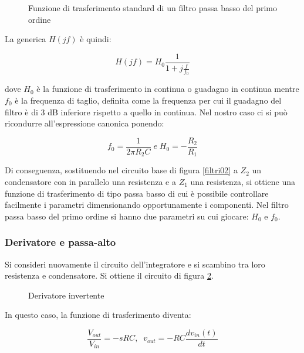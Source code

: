 \documentclass[../main.tex]{subfiles}
\begin{document}
\begin{figure}
\begin{center}


\label{filtri06}
\caption{Funzione di trasferimento standard di un filtro passa basso del primo ordine}	
\end{center}	
\end{figure}

La generica $H(jf)$ è quindi:

\begin{equation}
	H(jf) = H_0 \frac{1}{ 1 + j \frac{f}{f_0}}
\end{equation}

dove $H_0$ è la funzione di trasferimento in continua o guadagno in continua mentre $f_0$ è la frequenza di taglio, definita come la frequenza per cui il guadagno del filtro è di 3 dB inferiore rispetto a quello in continua. Nel nostro caso ci si può ricondurre all’espressione canonica ponendo:

\begin{equation}
	f_0 = \frac{1}{2\pi R_2 C} \; \unit{e} \; H_0 = - \frac{R_2}{R_1}
\end{equation}

Di conseguenza, sostituendo nel circuito base di figura \ref{filtri02} a $Z_2$ un condensatore con in parallelo una resistenza e a $Z_1$ una resistenza, si ottiene una funzione di trasferimento di tipo passa basso di cui è possibile controllare facilmente i parametri dimensionando opportunamente i componenti.
Nel filtro passa basso del primo ordine si hanno due parametri su cui giocare: $H_0$ e $f_0$.

\subsubsection{Derivatore e passa-alto}

Si consideri nuovamente il circuito dell’integratore e si scambino tra loro resistenza e condensatore. 
Si ottiene il circuito di figura \ref{filtri07}.

\begin{figure}
\begin{center}


\label{filtri07}
\caption{Derivatore invertente}	
\end{center}	
\end{figure}

In questo caso, la funzione di trasferimento diventa:

\begin{equation}
	\frac{V_{out}}{V_{in}} = -sRC, \; \; v_{out} = -RC \frac{dv_{in}(t)}{dt}
\end{equation}
\end{document}
